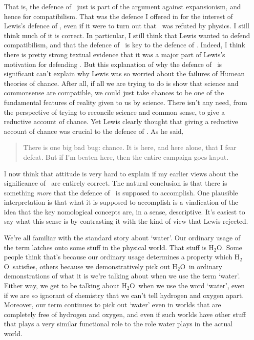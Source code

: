 \noindent That is, the defence of \HS\ just is part of the argument against expansionism, and hence for compatibilism. That was the defence I offered in \citet{Weatherson2009-WEADL}  for the interest of Lewis's defence of \HS,  even if it were to turn out that \HS\ was refuted by physics.  I still think much of it is correct. In particular, I still think that Lewis wanted to defend compatibilism, and that the defence of \HS\  is key to the defence of \HS.  Indeed, I think there is pretty strong textual evidence that it was a major part of Lewis's motivation for defending \HS. But this explanation of why the defence of \HS\  is significant can't explain why Lewis was so worried about the failures of Humean theories of chance. After all, if all we are trying to do is show that science and commonsense are compatible, we could just take chances to be one of the fundamental features of reality given to us by science. There isn't any need, from the perspective of trying to reconcile science and common sense, to give a reductive account of chance. Yet Lewis clearly thought that giving a reductive account of chance was crucial to the defence of \HS. As he said,

\begin{quote}
There is one big bad bug: chance. It is here, and here alone, that I fear defeat. But if I'm beaten here, then the entire campaign goes kaput. \cite[xiv]{Lewis1986b}
\end{quote}

\noindent  I now think that attitude is very hard to explain if my earlier views about the significance of \HS\  are entirely correct. The natural conclusion is that there is something \textit{more} that the defence of \HS\  is supposed to accomplish. One plausible interpretation is that what it is supposed to accomplish is a vindication of the idea that the key nomological concepts are, in a sense, descriptive.  It's easiest to say what this sense is by contrasting it with the kind of view that Lewis rejected.

\newcommand{\HO}{H$_2$O}

We're all familiar with the standard story about `water'.  Our ordinary usage of the term latches onto some stuff in the physical world. That stuff is \HO. Some people think that's because our ordinary usage determines a property which \HO\ satisfies, others because we demonstratively pick out \HO\ in ordinary demonstrations of what it is we're talking about when we use the term `water'.  Either way,  we get to be talking about \HO\ when we use the word `water', even  if we are so ignorant of chemistry that we can't tell hydrogen and oxygen apart. Moreover, our term continues to pick out `water'  even in worlds that are completely free of hydrogen and oxygen, and even if such worlds have other stuff that plays a very similar functional role to the role water plays in the actual world.

